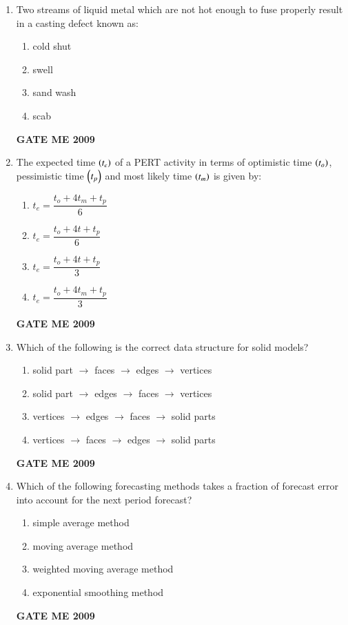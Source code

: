 \documentclass[journal]{IEEEtran}
\begin{document}
\begin{enumerate}[leftmargin=0pt]
\item Two streams of liquid metal which are not hot enough to fuse properly result in a casting defect known as:
  \begin{enumerate}
    \item cold shut
    \item swell
    \item sand wash
    \item scab
  \end{enumerate}
  \hfill{\textbf{GATE ME 2009}}


\item The expected time $\left(t_e\right)$ of a PERT activity in terms of optimistic time $\left(t_o\right)$, pessimistic time $\left(t_p\right)$ and most likely time $\left(t_m\right)$ is given by:
  \begin{enumerate}
    \item $t_e = \dfrac{t_o + 4 t_m + t_p}{6}$
    \item $t_e = \dfrac{t_o + 4 t + t_p}{6}$
    \item $t_e = \dfrac{t_o + 4 t + t_p}{3}$
    \item $t_e = \dfrac{t_o + 4 t_m + t_p}{3}$
  \end{enumerate}
  \hfill{\textbf{GATE ME 2009}}

\item Which of the following is the correct data structure for solid models?
  \begin{enumerate}
    \item solid part $\to$ faces $\to$ edges $\to$ vertices
    \item solid part $\to$ edges $\to$ faces $\to$ vertices
    \item vertices $\to$ edges $\to$ faces $\to$ solid parts
    \item vertices $\to$ faces $\to$ edges $\to$ solid parts
  \end{enumerate}
  \hfill{\textbf{GATE ME 2009}}



\item Which of the following forecasting methods takes a fraction of forecast error into account for the next period forecast?
  \begin{enumerate}
    \item simple average method
    \item moving average method
    \item weighted moving average method
    \item exponential smoothing method
  \end{enumerate}
  \hfill{\textbf{GATE ME 2009}}

\end{enumerate}
\end{document}
